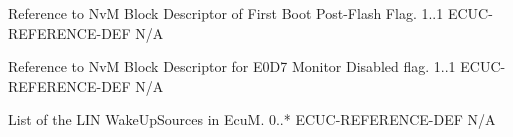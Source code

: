 {
{Reference to NvM Block Descriptor of First Boot Post-Flash Flag.}
{1..1}
{ECUC-REFERENCE-DEF}
{N/A}
{}
}{}

{
{Reference to NvM Block Descriptor for E0D7 Monitor Disabled flag.}
{1..1}
{ECUC-REFERENCE-DEF}
{N/A}
{}}
{}

{
{List of the LIN WakeUpSources in EcuM.}
{0..*}
{ECUC-REFERENCE-DEF}
{N/A}
{}
}{}
